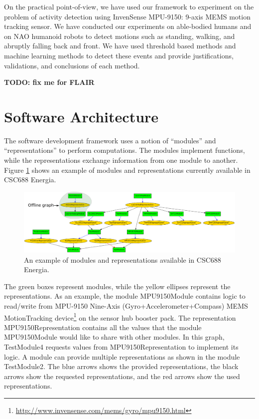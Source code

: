 \documentclass[letterpaper]{article}
\begin{document}
On the practical point-of-view, we have used our framework to experiment on the problem of activity
detection using InvenSense MPU-9150: 9-axis MEMS motion tracking sensor. We have conducted our
experiments on able-bodied humans and on NAO humanoid robots to detect motions such as standing,
walking, and abruptly falling back and front. We have used threshold based methods and machine
learning methods to detect these events and provide justifications, validations, and conclusions of
each method.  

\textbf{TODO: fix me for FLAIR}

\section{Software Architecture}

The software development framework uses a notion of ``modules'' and ``representations'' to perform
computations. The modules implement functions, while the representations exchange information from
one module to another. Figure \ref{fig:framework} shows an example of modules and representations
currently available in CSC688 Energia.

\begin{figure}[!t]
\centering
 \includegraphics[width=1.0\textwidth] {framework}
 \caption{An example of modules and representations available in CSC688 Energia.}
 \label{fig:framework}
\end{figure}

The green boxes represent modules, while the yellow ellipses represent the representations. As an
example, the module {\sf MPU9150Module} contains logic to read/write from MPU-9150 Nine-Axis
(Gyro+Accelerometer+Compass) MEMS MotionTracking
device\footnote{\url{http://www.invensense.com/mems/gyro/mpu9150.html}} on the sensor hub booster
pack. The representation {\sf MPU9150Representation} contains all the values that the module
{\sf MPU9150Module} would like to share with other modules. In this graph, {\sf TestModule4}
requests
values from {\sf MPU9150Representation} to implement its logic. A module can provide multiple
representations as shown in the module {\sf TestModule2}. The blue arrows shows the provided
representations, the black arrows show the requested representations, and the red arrows show the
used representations.
\end{document}
